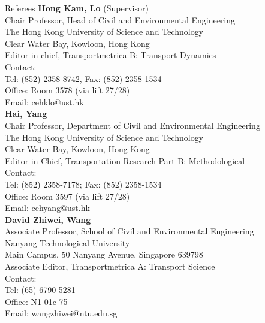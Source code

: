 \documentclass{resume} %
\begin{document}
\begin{rSection}{Referees}
\textbf{Hong Kam, Lo} (Supervisor)
\\
Chair Professor, Head of Civil and Environmental Engineering
\\
The Hong Kong University of Science and Technology\\
Clear Water Bay, Kowloon, Hong Kong
\\
Editor-in-chief, Transportmetrica B: Transport Dynamics
\smallskip \\
Contact:
\\
Tel: (852) 2358-8742, Fax: (852) 2358-1534
\\
Office: Room 3578 (via lift 27/28)
\\
Email: cehklo@ust.hk
\\
\textbf{Hai, Yang} \\
Chair Professor, Department of Civil and Environmental Engineering
\\
The Hong Kong University of Science and Technology
\\
Clear Water Bay, Kowloon, Hong Kong
\\
Editor-in-Chief, Transportation Research Part B: Methodological
\smallskip \\
Contact:
\\

Tel: (852) 2358-7178; Fax: (852) 2358-1534
\\
Office: Room 3597 (via lift 27/28)
\\
Email: cehyang@ust.hk
\\
\textbf{David Zhiwei, Wang}
\\
Associate Professor, School of Civil and Environmental Engineering
\\
Nanyang Technological University
\\
Main Campus, 50 Nanyang Avenue, Singapore 639798
\\
Associate Editor, Transportmetrica A: Transport Science \smallskip
\\
Contact:
\\
Tel: (65) 6790-5281
\\
Office: N1-01c-75
\\
Email: wangzhiwei@ntu.edu.sg
\\

\end{rSection}
\end{document}
